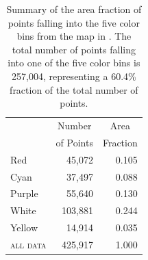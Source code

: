 \begin{table}
  \centering 
  \begin{tabular}{lrr}
	
  		 &  
		\multicolumn{1}{c}{Number} & 
		\multicolumn{1}{c}{Area}   \\
		
		&  
		\multicolumn{1}{c}{of Points} & 
		\multicolumn{1}{c}{Fraction}   \\


		\cmidrule(lr){2-2}
    	\cmidrule(lr){3-3}
	
   		Red & 
		45,072 & 
		0.105 \\
		
		Cyan & 
		37,497 & 
		0.088 \\
		
		Purple & 
		55,640 & 
		0.130 \\
		
		White & 
		103,881 & 
		0.244 \\
		
		Yellow & 
		14,914 & 
		0.035 \\
		
		\textsc{all data} & 
		425,917 & 
		1.000 \\

	\end{tabular}
  	\caption[Summary of color area fractions from ]{%
	Summary of the area fraction of points falling into the 
	five color bins from the map in . The total number of points falling
into one of the five color bins is 257,004, representing a 60.4\% fraction of the total
number of points.}
	\label{tab:sto001summary}
\end{table}

